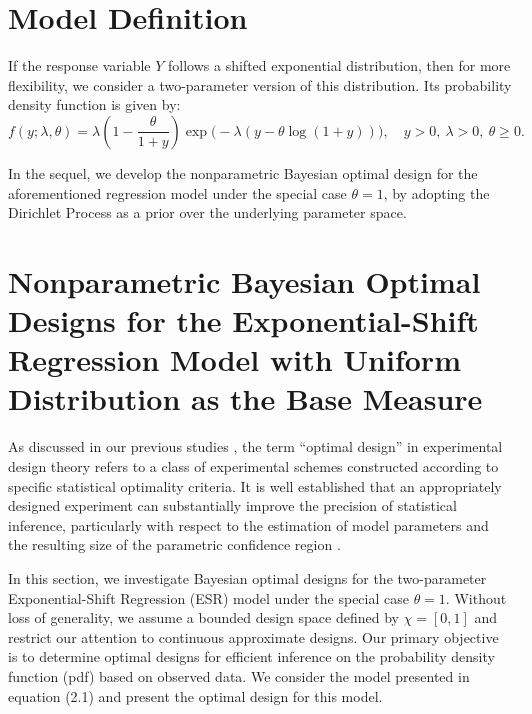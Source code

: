 \documentclass[twoside]{article}
\begin{document}
\section{Model Definition}

If the response variable $Y$ follows a shifted exponential distribution, then for more flexibility, we consider a two-parameter version of this distribution. Its probability density function is given by:
\begin{equation}
f(y; \lambda, \theta) = \lambda \left(1 - \frac{\theta}{1+y}\right) \exp\big(-\lambda (y - \theta \log(1+y))\big), \quad y>0, \ \lambda>0, \ \theta \ge 0.
\end{equation}

In the sequel, we develop the nonparametric Bayesian optimal design for the aforementioned regression model under the special case $\theta = 1$, by adopting the Dirichlet Process as a prior over the underlying parameter space.

\section{Nonparametric Bayesian Optimal Designs for the Exponential-Shift Regression Model with Uniform Distribution as the Base Measure}

As discussed in our previous studies \cite{Abdollahi:2023, Abdollahi:2024, Abdollahi:2025, Nanvapisheh:2024, Nanvapisheh:2025}, the term ``optimal design'' in experimental design theory refers to a class of experimental schemes constructed according to specific statistical optimality criteria. It is well established that an appropriately designed experiment can substantially improve the precision of statistical inference, particularly with respect to the estimation of model parameters and the resulting size of the parametric confidence region \cite{Burghaus:2014, Burkner:2019, Chernoff:1953, Chaloner:1983, Chaloner:1995, Chaloner:1989, Dette:2013, Dette:1996, Dette:1997}.  

In this section, we investigate Bayesian optimal designs for the two-parameter Exponential-Shift Regression (ESR) model under the special case $\theta = 1$. Without loss of generality, we assume a bounded design space defined by $\chi = [0,1]$ and restrict our attention to continuous approximate designs. Our primary objective is to determine optimal designs for efficient inference on the probability density function (pdf) based on observed data. We consider the model presented in equation (2.1) and present the optimal design for this model.
\end{document}
